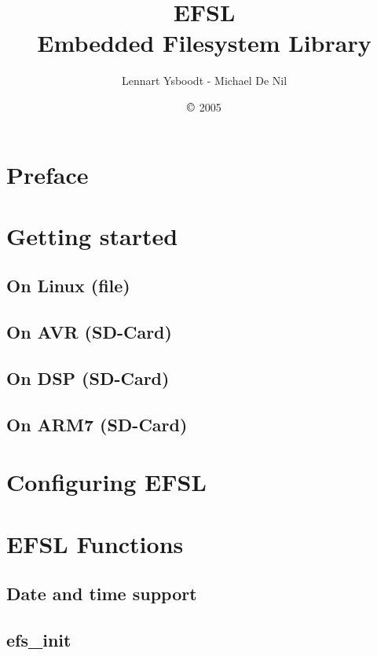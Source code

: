 \documentclass[a4paper,fleqn]{article}
\begin{document}
\title{\Huge{EFSL}\\\Large{Embedded Filesystem Library}}
\author{Lennart Ysboodt - Michael De Nil}
\date{$\copyright$ 2005}
\maketitle

\newpage
\tableofcontents

\setlength{\parindent}{0pt}
\setlength{\parskip}{1ex plus 0.5ex minus 0.2ex}

\newpage
\section{Preface}


\newpage
\section{Getting started}
\subsection{On Linux (file)}
	
\newpage
\subsection{On AVR (SD-Card)}
	
\newpage
\subsection{On DSP (SD-Card)}
	
\newpage
\subsection{On ARM7 (SD-Card)}
	
\newpage
\section{Configuring EFSL}
	
	
\newpage
\section{EFSL Functions}
\subsection{Date and time support}
	
	\newpage
\subsection{efs\_init}
	
	\newpage
\end{document}
